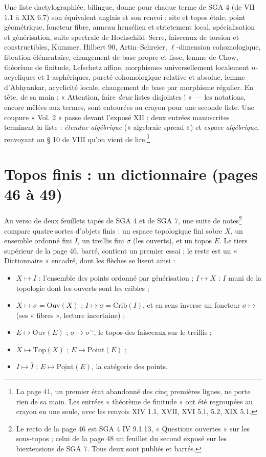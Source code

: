 \documentclass[11pt,a4paper]{article}
\begin{document}
Une liste dactylographiée, bilingue, donne pour chaque terme de SGA 4 (de VII
1.1 à XIX 6.7) son équivalent anglais et son renvoi : site et topos étale,
point géométrique, foncteur fibre, anneau hensélien et strictement local,
spécialisation et générisation, suite spectrale de Hochschild--Serre, faisceaux
de torsion et constructibles, Kummer, Hilbert 90, Artin--Schreier,
$\ell$-dimension cohomologique, fibration élémentaire, changement de base
propre et lisse, lemme de Chow, théorème de finitude, Lefschetz affine,
morphismes universellement localement $n$-acycliques et 1-asphériques,
pureté cohomologique relative et absolue, lemme d'Abhyankar, acyclicité locale,
changement de base par morphisme régulier. En tête, de sa main : « Attention,
faire \emph{deux} listes disjointes ! » --- les notations, encore mêlées aux
termes, sont entourées au crayon pour une seconde liste. Une coupure « Vol. 2 »
passe devant l'exposé XII ; deux entrées manuscrites terminent la liste :
\emph{étendue algébrique} (« algebraic spread ») et \emph{espace algébrique},
renvoyant au § 10 de VIII qu'on vient de lire.\footnote{La page 41, un premier
état abandonné des cinq premières lignes, ne porte rien de sa main. Les
entrées « théorème de finitude » ont été regroupées au crayon en une seule,
avec les renvois XIV 1.1, XVII, XVI 5.1, 5.2, XIX 5.1.}

\section*{Topos finis : un dictionnaire (pages 46 à 49)}

Au verso de deux feuillets tapés de SGA 4 et de SGA 7, une suite de notes\footnote{Le recto de la page 46 est SGA 4 IV 9.1.13, « Questions ouvertes »
sur les sous-topos ; celui de la page 48 un feuillet du second exposé sur les
biextensions de SGA 7. Tous deux sont publiés et barrés.}
compare quatre sortes d'objets finis : un espace topologique fini sobre $X$,
un ensemble ordonné fini $I$, un treillis fini $\sigma$ (les ouverts), et un
topos $E$. Le tiers supérieur de la page 46, barré, contient un premier essai ;
le reste est un « Dictionnaire » encadré, dont les flèches se lisent ainsi :

\begin{itemize}
\item $X \mapsto I$ : l'ensemble des points ordonné par générisation ;
$I \mapsto X$ : $I$ muni de la topologie dont les ouverts sont les cribles ;
\item $X \mapsto \sigma = \mathrm{Ouv}(X)$ ; $I \mapsto \sigma =
\mathrm{Crib}(I)$, et en sens inverse un foncteur $\sigma \mapsto$ (ses
« fibres », lecture incertaine) ;
\item $E \mapsto \mathrm{Ouv}(E)$ ; $\sigma \mapsto \sigma^{\sim}$, le topos
des faisceaux sur le treillis ;
\item $X \mapsto \mathrm{Top}(X)$ ; $E \mapsto \mathrm{Point}(E)$ ;
\item $I \mapsto \widehat{I}$ ; $E \mapsto \underline{\mathrm{Point}}(E)$, la
catégorie des points.
\end{itemize}
\end{document}
